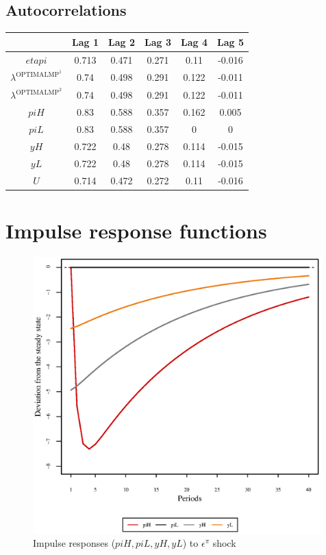 \subsection{Autocorrelations}

\begin{tabular}{c|ccccc|}
  & Lag 1 & Lag 2 & Lag 3 & Lag 4 & Lag 5\\
\hline
${e\!t\!a\!p\!i}$ & 0.713 & 0.471 & 0.271 & 0.11 & -0.016 \\
$\lambda^{\mathrm{OPTIMALMP}^{\mathrm{1}}}$ & 0.74 & 0.498 & 0.291 & 0.122 & -0.011 \\
$\lambda^{\mathrm{OPTIMALMP}^{\mathrm{2}}}$ & 0.74 & 0.498 & 0.291 & 0.122 & -0.011 \\
${p\!i\!H}$ & 0.83 & 0.588 & 0.357 & 0.162 & 0.005 \\
${p\!i\!L}$ & 0.83 & 0.588 & 0.357 & 0 & 0 \\
${y\!H}$ & 0.722 & 0.48 & 0.278 & 0.114 & -0.015 \\
${y\!L}$ & 0.722 & 0.48 & 0.278 & 0.114 & -0.015 \\
$U$ & 0.714 & 0.472 & 0.272 & 0.11 & -0.016 \\
\hline
\end{tabular}



\pagebreak

\section{Impulse response functions}

\begin{figure}[h]
\centering
\begin{minipage}{0.5\textwidth}
\vspace*{-3em}
\centering
\includegraphics[width=0.99\textwidth, scale=0.55]{plots/plot_3.eps}
\caption{Impulse responses (${p\!i\!H}, {p\!i\!L}, {y\!H}, {y\!L}$) to $\epsilon^{\pi}$ shock}
\end{minipage}
\end{figure}
